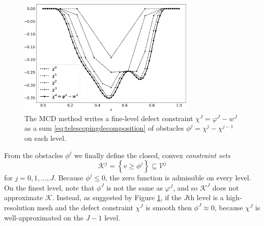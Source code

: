 \documentclass[letterpaper,final,12pt,reqno]{amsart}
\theoremstyle{claim}
\numberwithin{equation}{section}
\numberwithin{figure}{section}
\numberwithin{table}{section}
\numberwithin{theorem}{section}
\begin{document}
\begin{figure}
\includegraphics[width=0.75\textwidth]{fixfigs/decomp_defect.pdf}
\caption{The MCD method writes a fine-level defect constraint $\chi^J = \varphi^J - w^J$ as a sum \eqref{eq:telescopingdecomposition} of obstacles $\phi^j = \chi^j - \chi^{j-1}$ on each level.}
\label{fig:gooddecomposition}
\end{figure}

From the obstacles $\phi^j$ we finally define the closed, convex \emph{constraint sets}
\begin{equation}
\mathcal{K}^j = \left\{v \ge \phi^j\right\} \subseteq \mathcal{V}^j \label{eq:defineKj}
\end{equation}
for $j=0,1,\dots,J$.  Because $\phi^j \le 0$, the zero function is admissible on every level.  On the finest level, note that $\phi^J$ is not the same as $\varphi^J$, and so $\mathcal{K}^J$ does not approximate $\mathcal{K}$.  Instead, as suggested by Figure \ref{fig:gooddecomposition}, if the $J$th level is a high-resolution mesh and the defect constraint $\chi^J$ is smooth then $\phi^J\approx 0$, because $\chi^J$ is well-approximated on the $J-1$ level.
\end{document}
